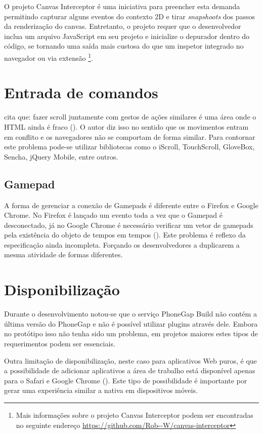 O projeto Canvas Interceptor é uma iniciativa para preencher
esta demanda permitindo capturar alguns eventos do contexto 2D e
tirar \textit{snapshoots} dos passos da renderização do canvas.
Entretanto, o projeto requer que o desenvolvedor inclua um arquivo
JavaScript em seu projeto e inicialize o depurador dentro do código,
se tornando uma saída mais custosa do que um inspetor integrado
no navegador ou via extensão \footnote{Mais informações sobre o
projeto Canvas Interceptor podem ser encontradas no seguinte endereço
\url{https://github.com/Rob--W/canvas-interceptor}}.

\section{Entrada de comandos}

\citet[p. 9]{aSeriousContender} cita que: fazer scroll juntamente
com gestos de ações similares é uma área onde o HTML ainda é
fraco (). O autor diz isso no sentido que os
movimentos entram em conflito e os navegadores não se comportam de forma
similar. Para contornar este problema pode-se utilizar bibliotecas como
o iScroll, TouchScroll, GloveBox, Sencha, jQuery Mobile, entre outros.

\subsection{Gamepad}

A forma de gerenciar a conexão de Gamepads é diferente entre o Firefox
e Google Chrome. No Firefox é lançado um evento toda a vez que o
Gamepad é desconectado, já no Google Chrome é necessário verificar
um vetor de gamepads pela existência do objeto de tempos em tempos
\textsc{\autocite{gamepad} (}). Este problema é
reflexo da especificação ainda incompleta. Forçando os desenvolvedores
a duplicarem a mesma atividade de formas diferentes.

\section{Disponibilização}

Durante o desenvolvimento notou-se que o serviço PhoneGap Build não
contém a última versão do PhoneGap e não é possível utilizar
plugins através dele. Embora no protótipo isso não tenha sido um
problema, em projetos maiores estes tipos de requerimentos podem ser
essenciais.

Outra limitação de disponibilização, neste caso para aplicativos
Web puros, é que a possibilidade de adicionar aplicativos a área
de trabalho está disponível apenas para o Safari e Google Chrome
(). Este tipo de possibilidade é importante por
gerar uma experiência similar a nativa em dispositivos móveis.

